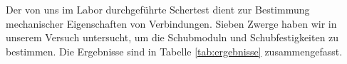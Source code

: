 Der von uns im Labor durchgeführte Schertest dient zur Bestimmung mechanischer Eigenschaften von Verbindungen.
Sieben Zwerge haben wir in unserem Versuch untersucht, um die Schubmoduln und Schubfestigkeiten zu bestimmen.
Die Ergebnisse sind in Tabelle \ref{tab:ergebnisse} zusammengefasst.